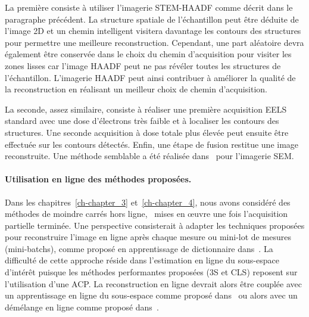 La première consiste à utiliser l'imagerie STEM-HAADF comme décrit dans le paragraphe précédent. La structure spatiale de l'échantillon peut être déduite de l'image 2D et un chemin intelligent visitera davantage les contours des structures pour permettre une meilleure reconstruction. Cependant, une part aléatoire devra également être conservée dans le choix du chemin d'acquisition pour visiter les zones lisses car l'image HAADF peut ne pas révéler toutes les structures de l'échantillon. L'imagerie HAADF peut ainsi contribuer à améliorer la qualité de la reconstruction en réalisant un meilleur choix de chemin d'acquisition.

La seconde, assez similaire, consiste à réaliser une première acquisition EELS standard avec une dose d'électrons très faible et à localiser les contours des structures. Une seconde acquisition à dose totale plus élevée peut ensuite être effectuée sur les contours détectés. Enfin, une étape de fusion restitue une image reconstruite. Une méthode semblable a été réalisée dans~\cite{dahmen2016feature} pour l'imagerie SEM.

\paragraph{Utilisation en ligne des méthodes proposées.} Dans les chapitres~\ref{ch-chapter_3} et~\ref{ch-chapter_4}, nous avons considéré des méthodes de moindre carrés hors ligne, \ie\ mises en \oe{}uvre une fois l'acquisition partielle terminée. Une perspective consisterait à adapter les techniques proposées pour reconstruire l'image en ligne après chaque mesure ou mini-lot de mesures (mini-batchs), comme proposé en apprentissage de dictionnaire dans~\cite{mairal2009online}. La difficulté de cette approche réside dans l'estimation en ligne du sous-espace d'intérêt puisque les méthodes performantes proposées  (3S et CLS) reposent sur l'utilisation d'une ACP.  La reconstruction en ligne devrait alors être couplée avec un apprentissage en ligne du sous-espace comme proposé dans~\cite{balzano2010online, chi2013petrels} ou alors avec un démélange en ligne comme proposé dans~\cite{thouvenin2016online}.


